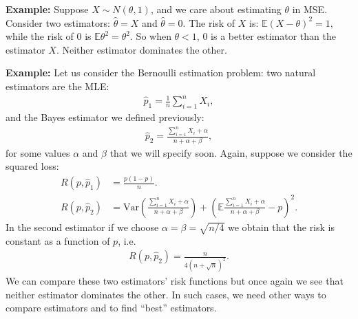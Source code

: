 \documentclass[twoside,12pt]{article}
\begin{document}
{\bf Example: } Suppose $X \sim N(\theta,1)$, and we care about estimating $\theta$ in
MSE. Consider two estimators: $\widehat{\theta} = X$ and $\widehat{\theta} = 0$. 
The risk of $X$ is: $\mathbb{E} (X - \theta)^2 = 1,$ while the risk of 0 is
$\mathbb{E} \theta^2 = \theta^2$. So when $\theta < 1$, $0$ is a better estimator
than the estimator $X$. Neither estimator dominates the other. 

{\bf Example: } Let us consider the Bernoulli estimation problem: two natural estimators
are the MLE: 
\begin{align*}
\widehat{p}_1 = \frac{1}{n} \sum_{i=1}^n X_i,
\end{align*}
and the Bayes estimator we defined previously:
\begin{align*}
\widehat{p}_2 = \frac{ \sum_{i=1}^n X_i + \alpha}{n + \alpha + \beta},
\end{align*}
for some values $\alpha$ and $\beta$ that we will specify soon.
Again, suppose we consider the squared loss:
\begin{align*}
R(p, \widehat{p}_1) &= \frac{ p (1 - p) }{n}. \\
R(p, \widehat{p}_2) &= \mathrm{Var} \left(  \frac{ \sum_{i=1}^n X_i + \alpha}{n + \alpha + \beta}\right) + 
\left( \mathbb{E}  \frac{ \sum_{i=1}^n X_i + \alpha}{n + \alpha + \beta} - p \right)^2. 
\end{align*}
In the second estimator if we choose $\alpha = \beta = \sqrt{n/4}$ we obtain that the risk 
is constant as a function of $p$, i.e. 
\begin{align*}
R(p, \widehat{p}_2) = \frac{ n} { 4(n + \sqrt{n})^2}.
\end{align*}
We can compare these two estimators' risk functions but once again we see that 
neither estimator dominates the other.
In such cases, we need other ways to compare estimators and to find ``best'' estimators.
\end{document}
